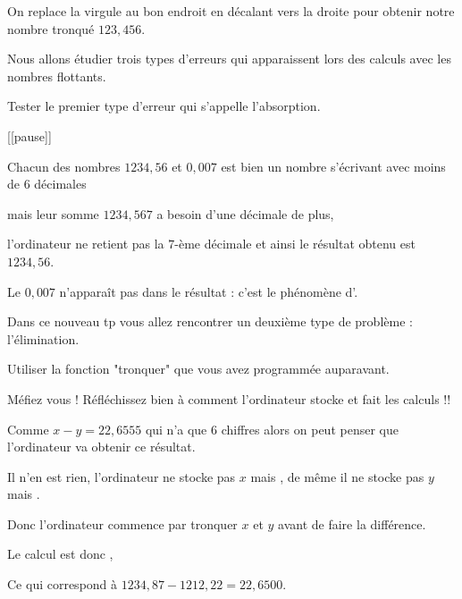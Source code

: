On replace la virgule au bon endroit en décalant vers 
la droite pour obtenir notre nombre tronqué $123,456$.



\diapo

Nous allons étudier trois types d'erreurs qui apparaissent lors des calculs avec les nombres flottants.

Tester le premier type d'erreur qui s'appelle l'absorption.


[[pause]]

\change

Chacun des nombres $1234,56$ et $0,007$ est bien un nombre s'écrivant avec 
moins de $6$ décimales

\change

mais leur somme $1234,567$ a besoin d'une décimale de plus,

\change

l'ordinateur ne retient pas la $7$-ème décimale
et ainsi le résultat obtenu est $1234,56$. 

\change

Le $0,007$ n'apparaît pas dans le résultat : c'est le phénomène d'.


\diapo

Dans ce nouveau tp vous allez rencontrer un deuxième type de problème : 
l'élimination.

Utiliser la fonction "tronquer" que vous avez programmée auparavant.

Méfiez vous ! Réfléchissez bien à comment l'ordinateur 
stocke et fait les calculs !!


\change

Comme $x-y = 22,6555$ qui n'a que $6$ chiffres alors 
on peut penser que l'ordinateur va obtenir ce résultat.

\change

Il n'en est rien, l'ordinateur ne stocke pas $x$ 
mais , de même il ne stocke pas $y$ 
mais .

\change

Donc l'ordinateur commence par tronquer $x$ et $y$ avant de faire la différence.

Le calcul est donc 
, 

\change

Ce qui correspond à $1234,87-1212,22=22,6500$.

